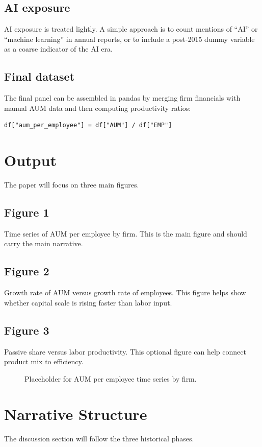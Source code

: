 \documentclass{article}
\begin{document}
\subsection{AI exposure}
AI exposure is treated lightly. A simple approach is to count mentions of ``AI'' or ``machine learning'' in annual reports, or to include a post-2015 dummy variable as a coarse indicator of the AI era.

\subsection{Final dataset}
The final panel can be assembled in pandas by merging firm financials with manual AUM data and then computing productivity ratios:
\begin{verbatim}
df["aum_per_employee"] = df["AUM"] / df["EMP"]
\end{verbatim}

\section{Output}
The paper will focus on three main figures.

\subsection{Figure 1}
Time series of AUM per employee by firm. This is the main figure and should carry the main narrative.

\subsection{Figure 2}
Growth rate of AUM versus growth rate of employees. This figure helps show whether capital scale is rising faster than labor input.

\subsection{Figure 3}
Passive share versus labor productivity. This optional figure can help connect product mix to efficiency.

\begin{figure}[h]
  \centering
  \fbox{\rule[-.5cm]{0cm}{4.5cm}\rule{0.92\linewidth}{0cm}}
  \caption{Placeholder for AUM per employee time series by firm.}
  \label{fig:aum_employee}
\end{figure}

\section{Narrative Structure}
The discussion section will follow the three historical phases.
\end{document}

